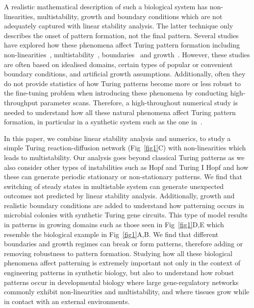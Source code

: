\documentclass[10pt,letterpaper]{article}
\begin{document}
A realistic mathematical description of such a biological system has non-linearities, multistability, growth and boundary conditions which are not adequately captured with linear stability analysis. The latter technique only describes the onset of pattern formation, not the final pattern.
Several studies have explored how these phenomena affect Turing pattern formation including non-linearities~\parencite{ermentrout1991stripes}, multistability~\parencite{Krause2023}, boundaries~\parencite{Arcuri1986,Maini1993, Maini1997,Krause2020, Krause2021, Woolley2022} and growth~\parencite{gaffney2010, Klika2017, Krause2019}.
However, these studies are often based on idealised domains, certain types of popular or convenient boundary conditions, and artificial growth assumptions.
Additionally, often they do not provide statistics of how Turing patterns become more or less robust to the fine-tuning problem when introducing these phenomena by conducting high-throughput parameter scans.
Therefore, a high-throughout numerical study is needed to understand how all these natural phenomena affect Turing pattern formation, in particular in a synthetic system such as the one in~\cite{Oliver2023}.

In this paper, we combine linear stability analysis and numerics, to study a simple Turing reaction-diffusion network (Fig~\ref{fig1}C) with non-linearities which leads to multistability.
Our analysis goes beyond classical Turing patterns as we also consider other types of instabilities such as Hopf and Turing I Hopf and how these can generate periodic stationary or non-stationary patterns.
We find that switching of steady states in multistable system can generate unexpected outcomes not predicted by linear stability analysis.
Additionally, growth and realistic boundary conditions are added to understand how patterning occurs in microbial colonies with synthetic Turing gene circuits. This type of model results in patterns in growing domains such as those seen in Fig~\ref{fig1}D,E which resemble the biological example in Fig~\ref{fig1}A,B. 
We find that different boundaries and growth regimes can break or form patterns, therefore adding or removing robustness to pattern formation.
Studying how all these biological phenomena affect patterning is extremely important not only in the context of engineering patterns in synthetic biology, but also to understand how robust patterns occur in developmental biology where large gene-regulatory networks commonly exhibit non-linearities and multistability, and where tissues grow while in contact with an external environments.
\end{document}
